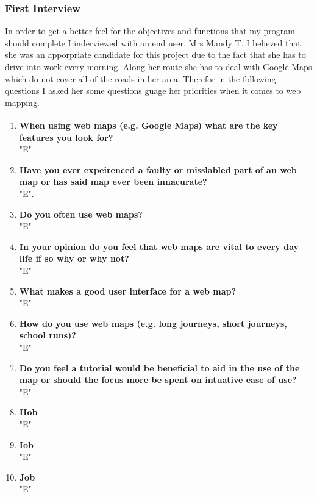 \begin{flushleft}
            \subsubsection{First Interview}
            \large
            In order to get a better feel for the objectives and functions that my program should complete I inderviewed with an end user, Mrs Mandy T. I believed that she was an apporpriate candidate for this
            project due to the fact that she has to drive into work every morning. Along her route she has to deal with Google Maps which do not cover all of the roads in her area. Therefor in the following questions
            I asked her some questions guage her priorities when it comes to web mapping.
            \bk
            \begin{enumerate}
                \item {\bf{When using web maps (e.g. Google Maps\textsuperscript{\small \textcopyright}) what are the key features you look for?}} \\
                \bk
                "E"
                \item {\bf{Have you ever expeirenced a faulty or misslabled part of an web map or has said map ever been innacurate?}} \\
                \bk
                "E".
                \item {\bf{Do you often use web maps?}} \\
                \bk
                "E"
                \item {\bf{In your opinion do you feel that web maps are vital to every day life if so why or why not? }} \\
                \bk
                "E"
                \item {\bf{What makes a good user interface for a web map?}} \\
                \bk 
                "E"
                \item {\bf{How do you use web maps (e.g. long journeys, short journeys, school runs)?}} \\
                \bk
                "E"
                \item {\bf{Do you feel a tutorial would be beneficial to aid in the use of the map or should the focus more be spent on intuative ease of use?}} \\
                \bk
                "E"
                \item {\bf{Hob}} \\
                \bk
                "E"
                \item {\bf{Iob}} \\
                \bk
                "E"
                \item {\bf{Job}} \\
                \bk
                "E"
            \end{enumerate}
            

\end{flushleft}
